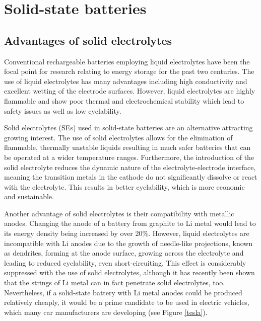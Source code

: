 \documentclass[12pt]{report}
\begin{document}
\section{Solid-state batteries}

\subsection{Advantages of solid electrolytes}

Conventional rechargeable batteries employing liquid electrolytes have been the focal point for research relating to energy storage for the past two centuries. 
The use of liquid electrolytes has many advantages including high conductivity and excellent wetting of the electrode surfaces. 
However, liquid electrolytes are highly flammable and show poor thermal and electrochemical stability which lead to safety issues as well as low cyclability.\cite{goodenough2012}

Solid electrolytes (SEs) used in solid-state batteries are an alternative attracting growing interest.\cite{famprikis2019, zhang2018b, ohno2020, bachman2016, manthiram2017, gao2018, kim2017,zhao2018, dawson2018b} 
The use of solid electrolytes allows for the elimination of flammable, thermally unstable liquids resulting in much safer batteries that can be operated at a wider temperature ranges.
Furthermore, the introduction of the solid electrolyte reduces the dynamic nature of the electrolyte-electrode interface, meaning the transition metals in the cathode do not significantly dissolve or react with the electrolyte.
This results in better cyclability, which is more economic and sustainable.

Another advantage of solid electrolytes is their compatibility with metallic anodes.
Changing the anode of a battery from graphite to Li metal would lead to its energy density being increased by over 20\%.\cite{janek2016}
However, liquid electrolytes are incompatible with Li anodes due to the growth of needle-like projections, known as dendrites, forming at the anode surface, growing across the electrolyte and leading to reduced cyclability, even short-circuiting.
This effect is considerably suppressed with the use of solid electrolytes, although it has recently been shown that the strings of Li metal can in fact penetrate solid electrolytes, too.\cite{porz2017}
Nevertheless, if a solid-state battery with Li metal anodes could be produced relatively cheaply, it would be a prime candidate to be used in electric vehicles, which many car manufacturers are developing (see Figure \ref{tesla}).\cite{luntz2015}
\end{document}
